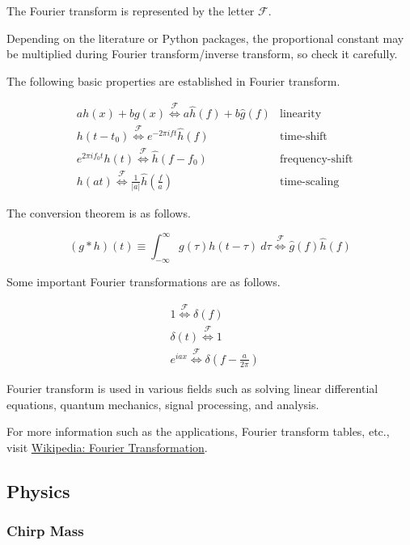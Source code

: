 The Fourier transform is represented by the letter $\mathcal{F}$.

Depending on the literature or Python packages, the proportional constant may be multiplied during Fourier transform/inverse transform, so check it carefully.

The following basic properties are established in Fourier transform.

\begin{align}
    &ah(x) + bg(x) \overset{\mathcal{F}}{\iff} a\hat{h}(f) + b\hat{g}(f) & \text{linearity} \\
    &h(t - t_0) \overset{\mathcal{F}}{\iff} e^{-2\pi i f t} \hat{h} (f) & \text{time-shift} \\
    &e^{2\pi i f_0 t}h(t) \overset{\mathcal{F}}{\iff} \hat{h} (f - f_0) & \text{frequency-shift} \\
    &h(at) \overset{\mathcal{F}}{\iff} \frac{1}{|a|} \hat{h} \left( \frac{f}{a} \right) & \text{time-scaling}
\end{align}

The conversion theorem is as follows.

\begin{equation}
    (g*h)(t) \equiv \int_{-\infty}^\infty g(\tau) h(t - \tau) \ d \tau \overset{\mathcal{F}}{\iff} \hat{g}(f) \hat{h}(f)
\end{equation}

Some important Fourier transformations are as follows.

\begin{align}
    &1 \overset{\mathcal{F}}{\iff} \delta(f) \\
    &\delta(t) \overset{\mathcal{F}}{\iff} 1 \\
    &e^{iax} \overset{\mathcal{F}}{\iff} \delta \left(f - \frac{a}{2\pi} \right)
\end{align}

Fourier transform is used in various fields such as solving linear differential equations, quantum mechanics, signal processing, and analysis.

For more information such as the applications, Fourier transform tables, etc., visit \href{https://en.wikipedia.org/wiki/Fourier_transform}{Wikipedia: Fourier Transformation}.

\subsection{Physics}

\subsubsection{Chirp Mass}

